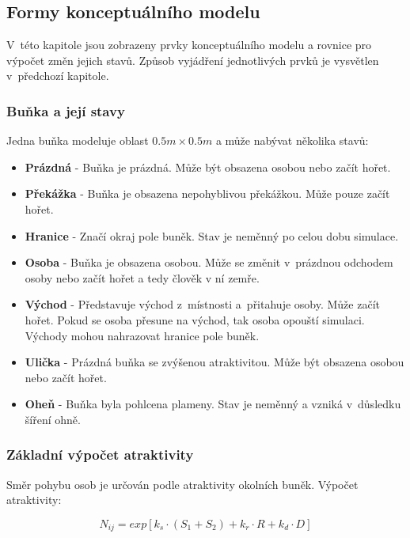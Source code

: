 \documentclass[11pt, titlepage, a4paper]{article}
\begin{document}
    \subsection{Formy konceptuálního modelu}
    V~této kapitole jsou zobrazeny prvky konceptuálního modelu a rovnice pro výpočet změn jejich stavů. Způsob vyjádření jednotlivých prvků je vysvětlen v~předchozí kapitole.

        \subsubsection{Buňka a její stavy}
        \label{bunka_a_jeji_stavy}
        Jedna buňka modeluje oblast $0.5m \times 0.5m$ a může nabývat několika stavů:
        
        \begin{itemize}
            \item \textbf{Prázdná} - Buňka je prázdná. Může být obsazena osobou nebo začít hořet. 
            \item \textbf{Překážka} - Buňka je obsazena nepohyblivou překážkou. Může pouze začít hořet.
            \item \textbf{Hranice} - Značí okraj pole buněk. Stav je neměnný po celou dobu simulace.
            \item \textbf{Osoba} - Buňka je obsazena osobou. Může se změnit v~prázdnou odchodem osoby nebo začít hořet a tedy člověk v ní zemře.
            \item \textbf{Východ} - Představuje východ z~místnosti a~přitahuje osoby. Může začít hořet. Pokud se osoba přesune na východ, tak osoba opouští simulaci. Východy mohou nahrazovat hranice pole buněk.
            \item \textbf{Ulička} - Prázdná buňka se zvýšenou atraktivitou. Může být obsazena osobou nebo začít hořet. 
            \item \textbf{Oheň} - Buňka byla pohlcena plameny. Stav je neměnný a vzniká v~důsledku šíření ohně.
        \end{itemize}

        \subsubsection{Základní výpočet atraktivity}
        Směr pohybu osob je určován podle atraktivity okolních buněk. Výpočet atraktivity:

        \begin{equation}
        \label{eq_Nij}
        N_{ij} = exp[k_s \cdot (S_1 + S_2) + k_r \cdot R + k_d \cdot D]
        \end{equation}
\end{document}
